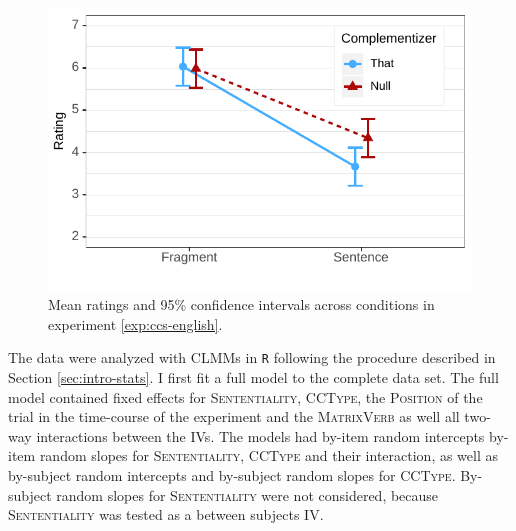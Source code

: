 \begin{figure}[t]
\includegraphics[scale=1]{figures/ex2b_ccs_en_estimates}
 \caption{Mean ratings and 95\% confidence intervals across conditions in experiment \ref{exp:ccs-english}. \label{fig:ccs-english-estimates}}
\end{figure}

The data were analyzed with CLMMs in \texttt{R} following the procedure described in Section \ref{sec:intro-stats}. I first fit a full model to the complete data set. The full model contained fixed effects for \textsc{Sententiality}, \textsc{CCType}, the \textsc{Position} of the trial in the time-course of the experiment and the \textsc{MatrixVerb} as well all two-way interactions between the IVs. The models had by-item random intercepts by-item random slopes for \textsc{Sententiality}, \textsc{CCType} and their interaction, as well as by-subject random intercepts and by-subject random slopes for \textsc{CCType}. By-subject random slopes for \textsc{Sententiality} were not considered, because \textsc{Sententiality} was tested as a between subjects IV. 

